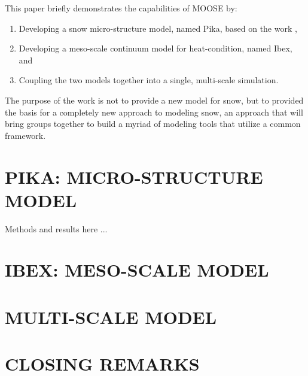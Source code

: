 This paper briefly demonstrates the capabilities of MOOSE by:
\begin{enumerate}
\item Developing a snow micro-structure model, named Pika, based on the work \citep{kaempfer2009phase},
\item Developing a meso-scale continuum model for heat-condition, named Ibex, and
\item Coupling the two models together into a single, multi-scale simulation.
\end{enumerate}

The purpose of the work is not to provide a new model for snow, but to provided the basis for a completely new approach to modeling snow, an approach that will bring groups together to build a myriad of modeling tools that utilize a common framework.

\section{PIKA: MICRO-STRUCTURE MODEL}\label{sec:pika}
Methods and results here ...

\section{IBEX: MESO-SCALE MODEL}\label{sec:ibex}





\section{MULTI-SCALE MODEL}\label{sec:yeti}


\section{CLOSING REMARKS}
